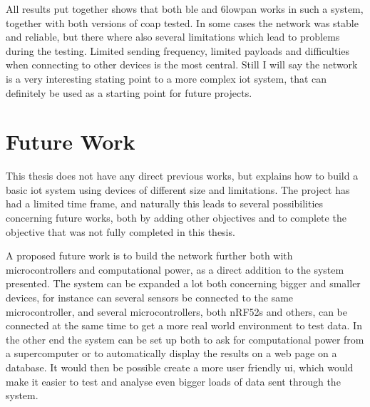 \noindent All results put together shows that both \gls{ble} and \gls{6lowpan} works in such a system, together with both versions of \gls{coap} tested. In some cases the network was stable and reliable, but there where also several limitations which lead to problems during the testing. Limited sending frequency, limited payloads and difficulties when connecting to other devices is the most central. Still I will say the network is a very interesting stating point to a more complex \gls{iot} system, that can definitely be used as a starting point for future projects. 


\section{Future Work}

This thesis does not have any direct previous works, but explains how to build a basic \gls{iot} system using devices of different size and limitations. The project has had a limited time frame, and naturally this leads to several possibilities concerning future works, both by adding other objectives and to complete the objective that was not fully completed in this thesis. 

A proposed future work is to build the network further both with \glspl{microcontroller} and computational power, as a direct addition to the system presented. The system can be expanded a lot both concerning bigger and smaller devices, for instance can several sensors be connected to the same \gls{microcontroller}, and several \glspl{microcontroller}, both \glspl{nRF52} and others, can be connected at the same time to get a more real world environment to test data. In the other end the system can be set up both to ask for computational power from a supercomputer or to automatically display the results on a web page on a database. It would then be possible create a more user friendly \gls{ui}, which would make it easier to test and analyse even bigger loads of data sent through the system. 





